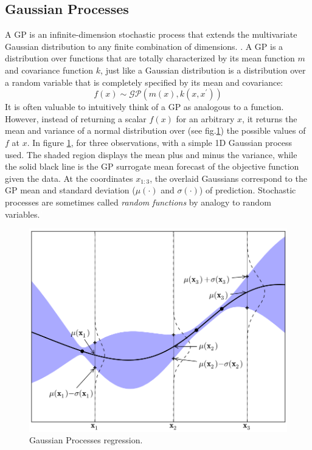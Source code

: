\subsection{Gaussian Processes}
A GP is an infinite-dimension stochastic process that extends the multivariate Gaussian distribution to any finite combination of dimensions. \cite{Freitas-BO}. A GP is a distribution over functions that are totally characterized by its mean function $m$ and covariance function $k$, just like a Gaussian distribution is a distribution over a random variable that is completely specified by its mean and covariance: 
$$ f(x) \sim \mathcal{GP}(m(x),k(x,x^\prime)) $$
It is\textcolor{white}{"}often valuable to intuitively think of a GP as analogous to a function. However, instead of returning a scalar $f(x)$ for an arbitrary $x$, it returns the mean and variance of a normal distribution over (see fig.\ref{fig:gp-example}) the possible values of $f$ at $x$. 
In figure \ref{fig:gp-example}, for three observations, with a simple 1D Gaussian process used. The shaded region displays the mean plus and minus the variance, while the solid black line is the GP surrogate mean forecast of the objective function given the data. At the coordinates $x_{1:3}$, the overlaid Gaussians correspond to the GP mean and standard deviation ($\mu(\cdot)$ and $\sigma(\cdot)$) of prediction.
Stochastic processes are sometimes called \textit{random functions} by analogy to random variables.\textcolor{white}{"}
\begin{figure}[H]
	\centering
	\includegraphics[scale=0.40]{figures/gp.png}
	\caption{Gaussian Processes regression.}
	\label{fig:gp-example}
\end{figure}

